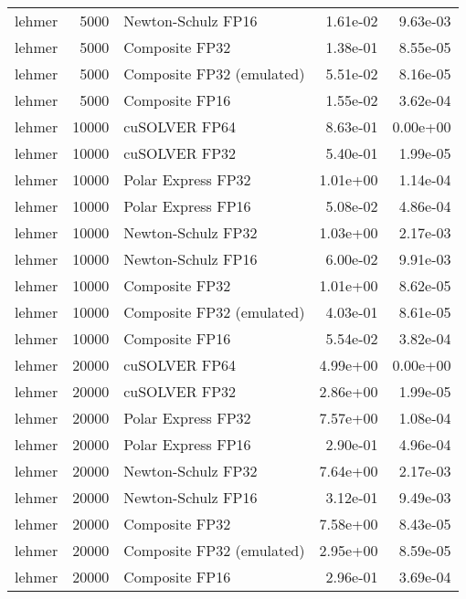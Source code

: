 \begin{table}
\begin{tabular}{lrlrr}
   lehmer &  5000 &        Newton-Schulz FP16 &  1.61e-02 &        9.63e-03 \\
   lehmer &  5000 &            Composite FP32 &  1.38e-01 &        8.55e-05 \\
   lehmer &  5000 & Composite FP32 (emulated) &  5.51e-02 &        8.16e-05 \\
   lehmer &  5000 &            Composite FP16 &  1.55e-02 &        3.62e-04 \\
   lehmer & 10000 &             cuSOLVER FP64 &  8.63e-01 &        0.00e+00 \\
   lehmer & 10000 &             cuSOLVER FP32 &  5.40e-01 &        1.99e-05 \\
   lehmer & 10000 &        Polar Express FP32 &  1.01e+00 &        1.14e-04 \\
   lehmer & 10000 &        Polar Express FP16 &  5.08e-02 &        4.86e-04 \\
   lehmer & 10000 &        Newton-Schulz FP32 &  1.03e+00 &        2.17e-03 \\
   lehmer & 10000 &        Newton-Schulz FP16 &  6.00e-02 &        9.91e-03 \\
   lehmer & 10000 &            Composite FP32 &  1.01e+00 &        8.62e-05 \\
   lehmer & 10000 & Composite FP32 (emulated) &  4.03e-01 &        8.61e-05 \\
   lehmer & 10000 &            Composite FP16 &  5.54e-02 &        3.82e-04 \\
   lehmer & 20000 &             cuSOLVER FP64 &  4.99e+00 &        0.00e+00 \\
   lehmer & 20000 &             cuSOLVER FP32 &  2.86e+00 &        1.99e-05 \\
   lehmer & 20000 &        Polar Express FP32 &  7.57e+00 &        1.08e-04 \\
   lehmer & 20000 &        Polar Express FP16 &  2.90e-01 &        4.96e-04 \\
   lehmer & 20000 &        Newton-Schulz FP32 &  7.64e+00 &        2.17e-03 \\
   lehmer & 20000 &        Newton-Schulz FP16 &  3.12e-01 &        9.49e-03 \\
   lehmer & 20000 &            Composite FP32 &  7.58e+00 &        8.43e-05 \\
   lehmer & 20000 & Composite FP32 (emulated) &  2.95e+00 &        8.59e-05 \\
   lehmer & 20000 &            Composite FP16 &  2.96e-01 &        3.69e-04 \\

\end{tabular}
\end{table}

